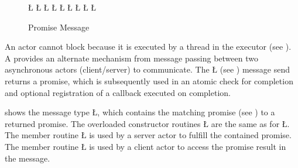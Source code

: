 \documentclass[openright,twoside]{report}
\begin{document}
\begin{figure}
\LGinlinefalse\LGbegin\lgrinde
\L{}
\L{\LB{}}
\CE{}\L{}
\L{\LB{}}
\L{\LB{}}
\CE{}\L{\LB{}}
\CE{}\L{\LB{}}
\CE{}\L{\LB{}}
\CE{}\L{\LB{\};}}
\endlgrinde\LGend
{}%
\caption{Promise Message}
\label{f:PromiseMessage}
\end{figure}

An actor cannot block because it is executed by a thread in the executor (see ).
A  provides an alternate mechanism from message passing between two asynchronous actors (client/server) to communicate.
The \LGinlinetrue\LGbegin\lgrinde\L{}\endlgrinde\LGend{} (see ) message send returns a promise, which is subsequently used in an atomic check for completion and optional registration of a callback executed on completion.

 shows the message type \LGinlinetrue\LGbegin\lgrinde\L{}\endlgrinde\LGend{}, which contains the matching promise (see ) to a returned promise.
The overloaded constructor routines \LGinlinetrue\LGbegin\lgrinde\L{}\endlgrinde\LGend{} are the same as for \LGinlinetrue\LGbegin\lgrinde\L{}\endlgrinde\LGend{}.
The member routine \LGinlinetrue\LGbegin\lgrinde\L{}\endlgrinde\LGend{} is used by a server actor to fulfill the contained promise.
The member routine \LGinlinetrue\LGbegin\lgrinde\L{}\endlgrinde\LGend{} is used by a client actor to access the promise result in the message.
\end{document}
